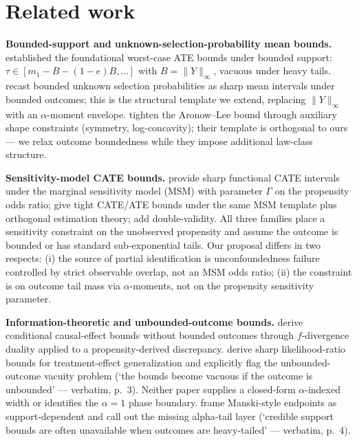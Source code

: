 \documentclass[11pt]{article}
\theoremstyle{definition}
\theoremstyle{plain}
\theoremstyle{remark}
\begin{document}
\section{Related work}

\textbf{Bounded-support and unknown-selection-probability mean bounds.}
\citet{Manski1990} established the foundational worst-case ATE bounds under bounded
support: $\tau \in [m_1 - B - (1-e)B,\ldots]$ with $B=\|Y\|_\infty$, vacuous under
heavy tails. \citet{AronowLee2013} recast bounded unknown selection probabilities as
sharp mean intervals under bounded outcomes; this is the structural template we
extend, replacing $\|Y\|_\infty$ with an $\alpha$-moment envelope.
\citet{MiratrixWagerZubizarreta2018} tighten the Aronow--Lee bound through auxiliary
shape constraints (symmetry, log-concavity); their template is orthogonal to ours --- we
relax outcome boundedness while they impose additional law-class structure.

\textbf{Sensitivity-model CATE bounds.}
\citet{KallusMaoZhou2019CATEIntervals} provide sharp functional CATE intervals under
the marginal sensitivity model (MSM) with parameter $\Gamma$ on the propensity odds
ratio; \citet{YadlowskyNamkoongBasuDuchiTian2022Bounds} give tight CATE/ATE bounds
under the same MSM template plus orthogonal estimation theory; \citet{DornGuoKallus2025DVDS}
add double-validity. All three families place a sensitivity constraint on the
unobserved propensity and assume the outcome is bounded or has standard sub-exponential
tails. Our proposal differs in two respects: (i) the source of partial identification
is unconfoundedness failure controlled by strict observable overlap, not an MSM odds
ratio; (ii) the constraint is on outcome tail mass via $\alpha$-moments, not on the
propensity sensitivity parameter.

\textbf{Information-theoretic and unbounded-outcome bounds.}
\citet{JungKang2026ITBounds} derive conditional causal-effect bounds without bounded
outcomes through $f$-divergence duality applied to a propensity-derived discrepancy.
\citet{AsiaeePalBeckHuling2026SharpGeneralization} derive sharp likelihood-ratio bounds
for treatment-effect generalization and explicitly flag the unbounded-outcome vacuity
problem (`the bounds become vacuous if the outcome is unbounded' --- verbatim, p.~3).
Neither paper supplies a closed-form $\alpha$-indexed width or identifies the
$\alpha=1$ phase boundary. \citet{LordanSalehzadehNobari2026TailUncertainty} frame
Manski-style endpoints as support-dependent and call out the missing alpha-tail layer
(`credible support bounds are often unavailable when outcomes are heavy-tailed' ---
verbatim, p.~4).
\end{document}

